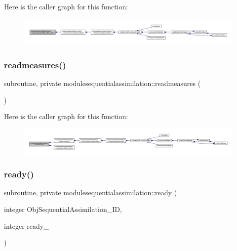 Here is the caller graph for this function\+:\nopagebreak
\begin{figure}[H]
\begin{center}
\leavevmode
\includegraphics[width=350pt]{namespacemodulesequentialassimilation_ad625646f49c7f79a25eece8ee6fc763c_icgraph}
\end{center}
\end{figure}
\mbox{\label{namespacemodulesequentialassimilation_a7972ca7b3c19868e67ca455d375e45af}} 
\subsubsection{\texorpdfstring{readmeasures()}{readmeasures()}}
{\footnotesize\ttfamily subroutine, private modulesequentialassimilation\+::readmeasures (\begin{DoxyParamCaption}{ }\end{DoxyParamCaption})\hspace{0.3cm}{\ttfamily [private]}}

Here is the caller graph for this function\+:\nopagebreak
\begin{figure}[H]
\begin{center}
\leavevmode
\includegraphics[width=350pt]{namespacemodulesequentialassimilation_a7972ca7b3c19868e67ca455d375e45af_icgraph}
\end{center}
\end{figure}
\mbox{\label{namespacemodulesequentialassimilation_a612c7f8e7d5560ffd80850c43f9e9c35}} 
\subsubsection{\texorpdfstring{ready()}{ready()}}
{\footnotesize\ttfamily subroutine, private modulesequentialassimilation\+::ready (\begin{DoxyParamCaption}\item[{integer}]{Obj\+Sequential\+Assimilation\+\_\+\+ID,  }\item[{integer}]{ready\+\_\+ }\end{DoxyParamCaption})\hspace{0.3cm}{\ttfamily [private]}}


